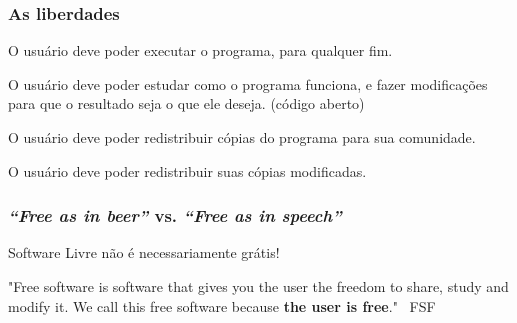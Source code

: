 \documentclass{beamer}
\begin{document}
\begin{frame}
  \frametitle{As liberdades}
  \begin{block}{}
  \begin{description}[<+->]
  \item[Liberdade 0] O usuário deve poder executar o programa, para qualquer fim.
  \item[Liberdade 1] O usuário deve poder estudar como o programa funciona, e fazer modificações para que o resultado seja o que ele deseja. (código aberto)
  \item[Liberdade 2] O usuário deve poder redistribuir cópias do programa para sua comunidade.
  \item[Liberdade 3] O usuário deve poder redistribuir suas cópias modificadas.
  \end{description}
  \end{block}
\end{frame}

\begin{frame}
   \frametitle{\emph{``Free as in beer''} vs. \emph{``Free as in speech''}}
   \begin{center}
     \begin{minipage}{0.8\textwidth}
       \begin{block}{}
         \begin{center}
           Software Livre não é necessariamente grátis!
         \end{center}
       \end{block}
     \end{minipage}
   \end{center}
   \vfill 
   "Free software is software that gives you the user the freedom to share, study and modify it. We call this free software because \textbf{the user is free}." \textemdash\ FSF
\end{frame}
\end{document}
